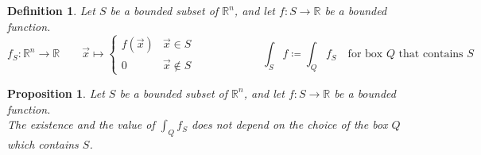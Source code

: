 \documentclass[11pt,oneside]{book}
\theoremstyle{break}
\theoremstyle{break}
\newtheorem{prop}[lem]{Proposition}
\newtheorem{defn}{Definition}[corL]
\newcommand{\R}{\mathbb{R}}
\begin{document}
\begin{defn}
Let $S$ be a bounded subset of $\R^n$, and let $f:S \to \R$ be a bounded function.
$$f_S : \R^n \to \R \qquad \vec{x}\mapsto \begin{cases}f(\vec{x}) & \vec{x} \in S \\ 0 &\vec{x}\notin S\end{cases} \qquad \qquad \qquad\int_S f \coloneqq \int_Q f_S \quad \text{for box } Q \text{ that contains }S$$
\end{defn}

\begin{prop}
Let $S$ be a bounded subset of $\R^n$, and let $f:S \to \R$ be a bounded function. \\The existence and the value of $\int_Q f_S$ does not depend on the choice of the box $Q$ which contains $S$.
\end{prop}
\end{document}
